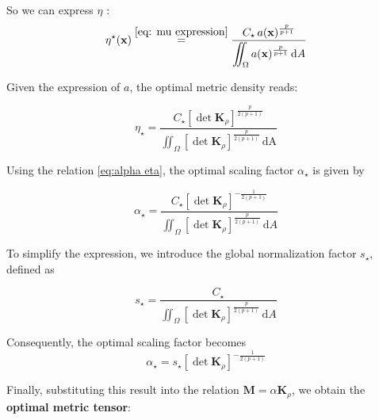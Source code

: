 \documentclass[11pt,a4paper]{article}
\begin{document}
\noindent So we can express $\eta$ :
\begin{equation}
    \label{eq:optimal_metric_density}
    \eta^\star(\mathbf{x})\overset{\eqref{eq: mu expression}}{=}
    \dfrac{
        C_\star\,a(\mathbf{x})^{\frac{p}{p+1}}
    }{
        \displaystyle\iint_\Omega
        a(\mathbf{x})^{\frac{p}{p+1}}
        \,\mathrm{d}A
    }
\end{equation}


\noindent Given the expression of $a$, the optimal metric density reads:

\begin{equation}
    \label{eq:optimal_metric_density_final}
    \boxed{
    \eta_\star=
    \dfrac{
        C_\star
        \left[\det\mathbf K_\rho\right]^{
            \frac{p}{2(p+1)}
        }
    }{
        \displaystyle\iint_\Omega
        \left[\det\mathbf K_\rho\right]^{
            \frac{p}{2(p+1)}
        }
        \,\mathrm{dA}
    }
    }
\end{equation}


\noindent Using the relation \eqref{eq:alpha eta},
the optimal scaling factor $\alpha_\star$ is given by

\begin{equation}
    \label{eq:optimal_alpha}
    \boxed{
    \alpha_\star=
    \dfrac{
        C_\star
        \left[\det\mathbf K_\rho\right]^{
            -\frac{1}{2(p+1)}
        }
    }{
        \displaystyle\iint_\Omega
        \left[\det\mathbf K_\rho\right]^{
            \frac{p}{2(p+1)}
        }
        \,\mathrm{d}A
    }
    }
\end{equation}



\noindent To simplify the expression, we introduce the global
normalization factor $s_\star$, defined as

\begin{equation}
    \label{eq:optimal_global_scaling}
    s_\star =
    \dfrac{
        C_\star
    }{
        \displaystyle\iint_\Omega
        \left[\det\mathbf K_\rho\right]^{
            \frac{p}{2(p+1)}
        }
        \,\mathrm{d}A
    }
\end{equation}

\noindent Consequently, the optimal scaling factor becomes
\begin{equation}
    \alpha_\star =
    s_\star
    \left[\det\mathbf K_\rho\right]^{
        -\frac{1}{2(p+1)}
    }
\end{equation}

\noindent Finally, substituting this result into the relation
$\mathbf M=\alpha\mathbf K_\rho$, we obtain the
\textbf{optimal metric tensor}:
\end{document}
